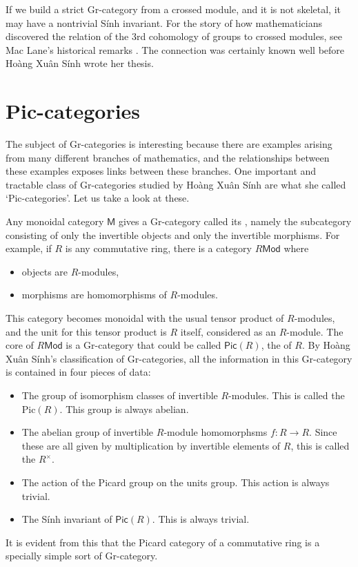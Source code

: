 \documentclass[reqno,12pt]{amsart}
\newcommand{\maps}{\colon}    %
\newcommand{\M}{{\mathsf{M}}}   %
\newcommand{\Mod}{\mathsf{Mod}}
\newcommand{\Pic}{\mathsf{Pic}}
\newcommand{\define}[1]{\textbf{\boldmath{#1}}}
\theoremstyle{definition}
\begin{document}
If we build a strict Gr-category from a crossed module, and it is not skeletal,
it may have a nontrivial S\'inh invariant.    For the story of how mathematicians discovered the relation of the 3rd cohomology of groups to crossed modules, see Mac Lane's historical remarks \cite{M79,M88}.  The connection was certainly known well before Ho\`ang Xu\^an S\'inh wrote her thesis.

\section{Pic-categories}
\label{sec:Pic}

The subject of Gr-categories is interesting because there are examples arising from many different branches of mathematics, and the relationships between these examples exposes links between these branches.  One important and tractable class of Gr-categories studied by Ho\`ang Xu\^an S\'inh are what she called `Pic-categories'.  Let us take a look at these.

Any monoidal category $\M$ gives a Gr-category called its \define{core}, namely the subcategory consisting of only the invertible objects and only the invertible morphisms.   For example, if $R$ is any commutative ring, there is a category $R \Mod$ where
\begin{itemize}
\item objects are $R$-modules,
\item morphisms are homomorphisms of $R$-modules.
\end{itemize}
This category becomes monoidal with the usual tensor product of $R$-modules, 
and the unit for this tensor product is $R$ itself, considered
as an $R$-module.  The core of $R \Mod$ is a Gr-category that could
be called $\Pic(R)$, the \define{Picard category} of $R$.  By Ho\`ang Xu\^an S\'inh's
classification of Gr-categories, all the information in this Gr-category is contained in four pieces of
data:
\begin{itemize}
\item 
The group of isomorphism classes of invertible $R$-modules.  This is
called the \define{Picard group} $\mathrm{Pic}(R)$.  This group is always abelian.
\item 
The abelian group of invertible $R$-module homomorphsms $f \maps R \to R$.
Since these are all given by multiplication by invertible elements of $R$, this is
called the \define{units group} $R^\times$.
\item
The action of the Picard group on the units group.  This action is always trivial.
\item
The S\'inh invariant of $\Pic(R)$.  This is always trivial.
\end{itemize}
It is evident from this that the Picard category of a commutative ring is a specially simple sort of Gr-category.
\end{document}
